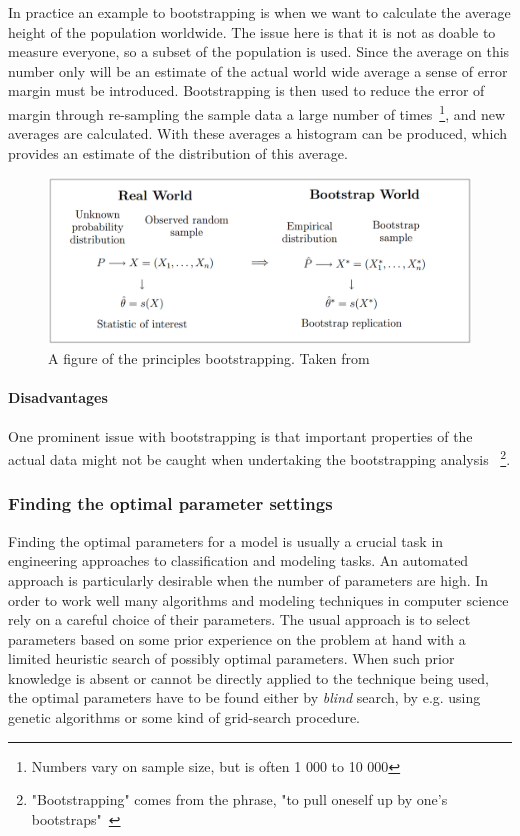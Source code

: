 In practice an example to bootstrapping is when we want to calculate the average height of the population worldwide.
The issue here is that it is not as doable to measure everyone, so a subset of the population is used.
Since the average on this number only will be an estimate of the actual world wide average a sense of error margin must be introduced.
Bootstrapping is then used to reduce the error of margin through re-sampling the sample data a large number of times~\footnote{Numbers vary on sample size, but is often 1 000 to 10 000}, and new averages are calculated.
With these averages a histogram can be produced, which provides an estimate of the distribution of this average.

\begin{figure}[H]
    \includegraphics[width=5in]{image/bootstrap.png}
    \centering
    \caption[Bootstrapping principles]{A figure of the principles bootstrapping. Taken from~\cite{Eichler2003}}
    \label{figure:bootstrapping}
\end{figure}

\paragraph{Disadvantages}
	One prominent issue with bootstrapping is that important properties of the actual data might not be caught when undertaking the bootstrapping analysis
	~\footnote{"Bootstrapping" comes from the phrase, "to pull oneself up by one's bootstraps"~\cite{bootstrapSaying1843}}.


\subsubsection{Finding the optimal parameter settings}

Finding the optimal parameters for a model is usually a crucial task in engineering approaches to classification and modeling tasks. An automated approach is particularly desirable when the number of parameters are high. In order to work well many algorithms and modeling techniques in computer science rely on a careful choice of their parameters. The usual approach is to select parameters based on some prior experience on the problem at hand with a limited heuristic search of possibly optimal parameters. When such prior knowledge is absent or cannot be directly applied to the technique being used, the optimal parameters have to be found either by \emph{blind} search, by e.g. using genetic algorithms or some kind of grid-search procedure.

